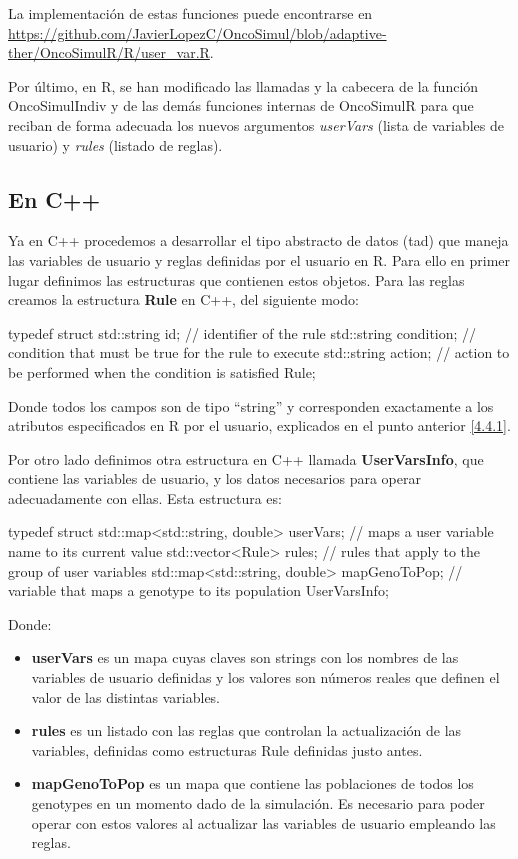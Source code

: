 La implementación de estas funciones puede encontrarse en \url{https://github.com/JavierLopezC/OncoSimul/blob/adaptive-ther/OncoSimulR/R/user_var.R}.

Por último, en R, se han modificado las llamadas y la cabecera de la función OncoSimulIndiv y de las demás funciones internas de OncoSimulR\cite{OncoSimulR} para que reciban de forma adecuada los nuevos argumentos \textit{userVars} (lista de variables de usuario) y \textit{rules} (listado de reglas).

\subsection{En C++}\label{4.4.2}

Ya en C++ procedemos a desarrollar el tipo abstracto de datos (\gls{tad}) que maneja las variables de usuario y reglas definidas por el usuario en R. Para ello en primer lugar definimos las estructuras que contienen estos objetos. Para las reglas creamos la estructura \textbf{Rule} en C++, del siguiente modo:

\begin{CPP}
typedef struct {
    std::string id; // identifier of the rule
    std::string condition; // condition that must be true for the rule to execute
    std::string action; // action to be performed when the condition is satisfied
} Rule;
\end{CPP}

Donde todos los campos son de tipo ``string'' y corresponden exactamente a los atributos especificados en R por el usuario, explicados en el punto anterior \ref{4.4.1}.

Por otro lado definimos otra estructura en C++ llamada \textbf{UserVarsInfo}, que contiene las variables de usuario, y los datos necesarios para operar adecuadamente con ellas. Esta estructura es:

\begin{CPP}
typedef struct{
    std::map<std::string, double> userVars; // maps a user variable name to its current value
    std::vector<Rule> rules; // rules that apply to the group of user variables
    std::map<std::string, double> mapGenoToPop; // variable that maps a genotype to its population
}UserVarsInfo;
\end{CPP}

Donde:
\begin{itemize}
	\item \textbf{userVars} es un mapa cuyas claves son strings con los nombres de las variables de usuario definidas y los valores son números reales que definen el valor de las distintas variables.
	\item \textbf{rules} es un listado con las reglas que controlan la actualización de las variables, definidas como estructuras Rule definidas justo antes.
	\item \textbf{mapGenoToPop} es un mapa que contiene las poblaciones de todos los \glspl{genotype} en un momento dado de la simulación. Es necesario para poder operar con estos valores al actualizar las variables de usuario empleando las reglas.
\end{itemize}

